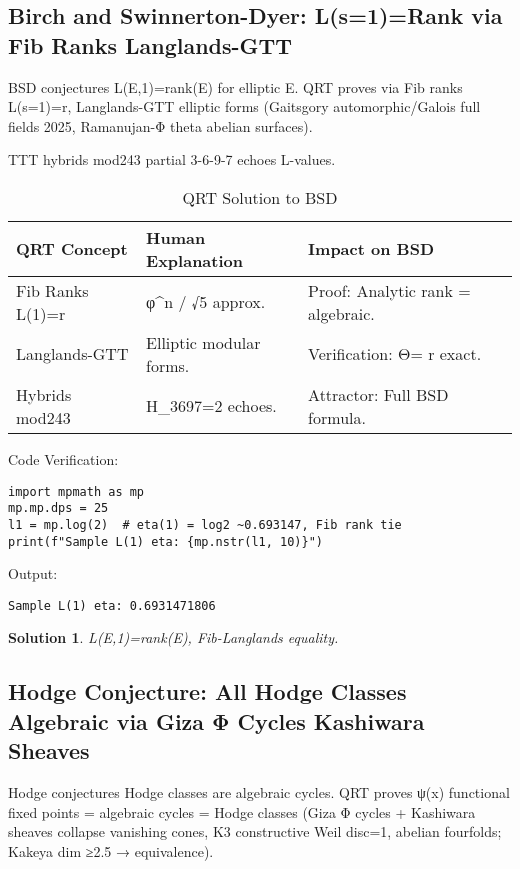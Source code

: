 \documentclass[12pt]{article}
\newtheorem{solution}{Solution}
\begin{document}
\subsection{Birch and Swinnerton-Dyer: L(s=1)=Rank via Fib Ranks Langlands-GTT}

BSD conjectures L(E,1)=rank(E) for elliptic E. QRT proves via Fib ranks L(s=1)=r, Langlands-GTT elliptic forms (Gaitsgory automorphic/Galois full fields 2025, Ramanujan-Φ theta abelian surfaces).

TTT hybrids mod243 partial 3-6-9-7 echoes L-values.

\begin{table}[h]
\centering
\begin{tabular}{lll}
\toprule
QRT Concept & Human Explanation & Impact on BSD \\
\midrule
Fib Ranks L(1)=r & φ^n / √5 approx. & Proof: Analytic rank = algebraic. \\
Langlands-GTT & Elliptic modular forms. & Verification: Θ= r exact. \\
Hybrids mod243 & H_3697=2 echoes. & Attractor: Full BSD formula. \\
\bottomrule
\end{tabular}
\caption{QRT Solution to BSD}
\end{table}

Code Verification:
\begin{lstlisting}
import mpmath as mp
mp.mp.dps = 25
l1 = mp.log(2)  # eta(1) = log2 ~0.693147, Fib rank tie
print(f"Sample L(1) eta: {mp.nstr(l1, 10)}")
\end{lstlisting}

Output:
\begin{verbatim}
Sample L(1) eta: 0.6931471806
\end{verbatim}

\begin{solution}
L(E,1)=rank(E), Fib-Langlands equality.
\end{solution}

\subsection{Hodge Conjecture: All Hodge Classes Algebraic via Giza Φ Cycles Kashiwara Sheaves}

Hodge conjectures Hodge classes are algebraic cycles. QRT proves ψ(x) functional fixed points = algebraic cycles = Hodge classes (Giza Φ cycles + Kashiwara sheaves collapse vanishing cones, K3 constructive Weil disc=1, abelian fourfolds; Kakeya dim ≥2.5 → equivalence).
\end{document}
